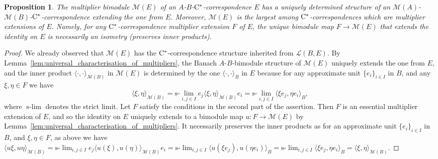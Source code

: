 \documentclass[11 pt, leqno]{amsart}
\numberwithin{equation}{section}
\theoremstyle{plain}
\newtheorem {prop}[thm] {Proposition}
\theoremstyle{definition}
\newcommand{\M}{\mathcal M}
\renewcommand{\L}{\mathcal L}
\newcommand{\cst}{\ifmmode\mathrm{C}^*\else{$\mathrm{C}^*$}\fi}
\begin{document}
\begin{prop}\label{prop:universal_multiplier_description}
The multiplier bimodule $\M(E)$ of an $A$-$B$-$\cst$-correspondence $E$ has a uniquely determined structure of an $\M(A)$-$\M(B)$-$\cst$-correspondence extending the one from $E$. 
Moreover, $\M(E)$ is the largest among $\cst$-correspondences which are multiplier extensions of $E$. 
Namely, for any $\cst$-correspondence multiplier extension $F$ of $E$, the unique bimodule map $F\to \M(E)$ that extends the identity on $E$ is necessarily an isometry (preserves inner products). 
\end{prop}
\begin{proof} 
We already observed that $\M(E)$ has the $\cst$-correspondence structure inherited from $\L(B,E)$.
By Lemma~\ref{lem:universal_characterisation_of_multipliers}, the Banach $A$-$B$-bimodule structure of $\M(E)$ uniquely extends the one from $E$, and the  inner product $\langle \cdot, \cdot \rangle_{\M(B)}$ in $\M(E)$ is determined by the one $\langle \cdot, \cdot \rangle_{B}$ in $E$ because for any approximate unit $\{e_i\}_{i \in I}$ in $B$, and any $\xi,\eta \in F$ we have 
\[
    \langle \xi, \eta\rangle_{\M(B)}=\text{s-}\!\lim_{i,j\in I} e_j\langle \xi, \eta\rangle_{\M(B)} e_i=\text{s-}\!\lim_{i,j\in I} \langle \xi e_j , \eta e_i \rangle_{B},
\] 
where $\text{s-}\!\lim$ denotes the strict limit. 
Let $F$ satisfy the conditions in the second part of the assertion. 
Then $F$ is an essential multiplier extension of $E$, and so the identity on $E$ uniquely extends to a bimodule map $u:F\to \M(E)$ by Lemma~\ref{lem:universal_characterisation_of_multipliers}.
It necessarily preserves the inner products as for an approximate unit $\{e_i\}_{i \in I}$ in $B$, and  $\xi,\eta \in F$, as above we have $\langle u\xi, u\eta\rangle_{\M(B)}=\text{s-}\!\lim_{i,j\in I} e_j\langle u(\xi), u(\eta)\rangle_{\M(B)} e_i=\text{s-}\!\lim_{i,j\in I} \langle u(\xi e_j) , u(\eta e_i) \rangle_{B}=\text{s-}\!\lim_{i,j\in I} \langle \xi e_j , \eta e_i \rangle_{B}=\langle \xi, \eta\rangle_{\M(B)}$. 
\end{proof}
\end{document}
